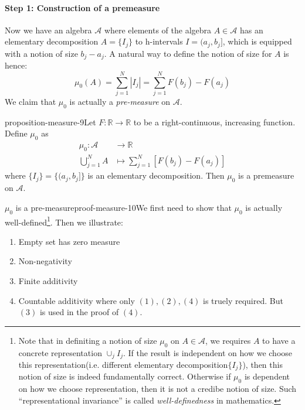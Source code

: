 \paragraph{Step 1: Construction of a premeasure}

Now we have an algebra $\mathcal A$ where elements of the algebra $A\in \mathcal A$ has an elementary decomposition $A=\{I_j\}$ to h-intervals $I=(a_j,b_j]$, which is equipped with a notion of size $b_j -a_j$. A natural way to define the notion of size for $A$ is hence:
\begin{equation}
\mu_0(A) = \sum_{j=1}^N |I_j| =\sum_{j=1}^N F(b_j)-F(a_j)
\end{equation}
We claim that $\mu_0$ is actually a \textit{pre-measure} on $\mathcal A$.

\begin{mystthmproposition}{}{proposition-measure-9}Let $F:\mathbb{R}\to\mathbb{R}$ to be a right-continuous, increasing function. Define $\mu_0$ as
\begin{equation}
\begin{aligned}
\mu_0 : \mathcal A &\to \mathbb{R} \\
\bigcup_{j=1}^N A &\mapsto \sum_{j=1}^N [F(b_j)-F(a_j)]
\end{aligned}
\end{equation}
where $\{I_j\}=\{(a_j,b_j]\}$ is an elementary decomposition. Then $\mu_0$ is a premeasure on $\mathcal A$.

\end{mystthmproposition}
\begin{mystthmproof}{$\mu_0$ is a pre-measure}{proof-measure-10}We first need to show that $\mu_0$ is actually well-defined\footnote{Note that in definiting a notion of size $\mu_0$ on $A\in \mathcal A$, we requires $A$ to have a concrete representation $\cup_j I_j$. If the result is independent on
how we choose this representation(i.e. different elementary decomposition$\{I_j\}$), then this notion of size is indeed fundamentally correct. Otherwise if $\mu_0$ is dependent on how we choose representation, then it is not a credibe notion of size. Such ``representational invariance'' is called \textit{well-definedness} in mathematics.}. Then we illustrate:

\begin{enumerate}
\item Empty set has zero measure
\item Non-negativity
\item Finite additivity
\item Countable additivity
where only $(1),(2),(4)$ is truely required. But $(3)$ is used in the proof of $(4)$.
\end{enumerate}

\end{mystthmproof}